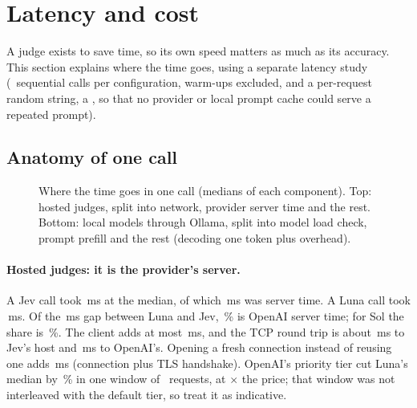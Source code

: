 \section{Latency and cost}\label{sec:latency}

A judge exists to save time, so its own speed matters as much as its accuracy. This section explains
where the time goes, using a separate latency study (\LatNSeq\ sequential calls per configuration,
warm-ups excluded, and a per-request random string, a , so that no provider or local prompt
cache could serve a repeated prompt).

\subsection{Anatomy of one call}

\begin{figure}[htbp]
\centering

\caption{Where the time goes in one call (medians of each component). Top: hosted judges, split into
network, provider server time and the rest. Bottom: local models through Ollama, split into model
load check, prompt prefill and the rest (decoding one token plus overhead).}
\label{fig:anatomy}
\end{figure}

\begin{table}[htbp]
\centering\small
\caption{The numbers behind \cref{fig:anatomy}. Components are separate medians, so they need not add
exactly to the median wall time; the residual is shown as ``rest.''}
\label{tab:anatomy}

\end{table}

\paragraph{Hosted judges: it is the provider's server.} A Jev call took \LatJevWall\,ms at the median,
of which \LatJevServer\,ms was server time. A Luna call took \LatLunaWall\,ms. Of the
\LatLunaGap\,ms gap between Luna and Jev, \LatLunaServerShare\,\% is OpenAI server time; for Sol the
share is \LatSolServerShare\,\%. The client adds at most \LatClientMax\,ms, and the TCP round trip is
about \LatRttJev\,ms to Jev's host and \LatRttOpenAI\,ms to OpenAI's. Opening a fresh connection
instead of reusing one adds \LatFreshRange\,ms (connection plus TLS handshake). OpenAI's priority tier cut
Luna's median by \LatPrioCut\,\% in one window of \LatPrioN\ requests, at \PriorityMultiplier$\times$ the
price; that window was not interleaved with the default tier, so treat it as indicative.

